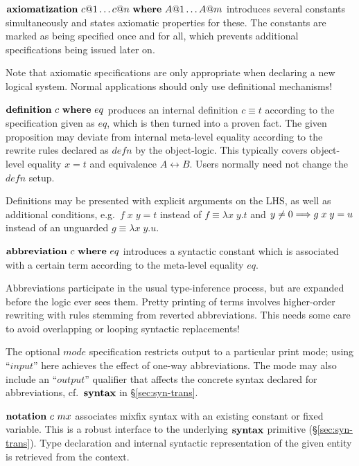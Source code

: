 \begin{descr}
  
\item ${\mathord{\mathbf{axiomatization}}} ~ c@1 \dots c@n ~
  {\mathord{\mathbf{where}}} ~ A@1 \dots A@m$ introduces several constants
  simultaneously and states axiomatic properties for these.  The
  constants are marked as being specified once and for all, which
  prevents additional specifications being issued later on.
  
  Note that axiomatic specifications are only appropriate when
  declaring a new logical system.  Normal applications should only use
  definitional mechanisms!

\item ${\mathord{\mathbf{definition}}}~c~{\mathord{\mathbf{where}}}~eq$ produces an
  internal definition $c \equiv t$ according to the specification
  given as $eq$, which is then turned into a proven fact.  The given
  proposition may deviate from internal meta-level equality according
  to the rewrite rules declared as $defn$ by the object-logic.  This
  typically covers object-level equality $x = t$ and equivalence $A
  \leftrightarrow B$.  Users normally need not change the $defn$
  setup.
  
  Definitions may be presented with explicit arguments on the LHS, as
  well as additional conditions, e.g.\ $f\;x\;y = t$ instead of $f
  \equiv \lambda x\;y. t$ and $y \not= 0 \Longrightarrow g\;x\;y = u$ instead of
  an unguarded $g \equiv \lambda x\;y. u$.
  
\item ${\mathord{\mathbf{abbreviation}}}~c~{\mathord{\mathbf{where}}}~eq$ introduces
  a syntactic constant which is associated with a certain term
  according to the meta-level equality $eq$.
  
  Abbreviations participate in the usual type-inference process, but
  are expanded before the logic ever sees them.  Pretty printing of
  terms involves higher-order rewriting with rules stemming from
  reverted abbreviations.  This needs some care to avoid overlapping
  or looping syntactic replacements!
  
  The optional $mode$ specification restricts output to a particular
  print mode; using ``$input$'' here achieves the effect of one-way
  abbreviations.  The mode may also include an ``$output$'' qualifier
  that affects the concrete syntax declared for abbreviations, cf.\ 
  ${\mathord{\mathbf{syntax}}}$ in \S\ref{sec:syn-trans}.
  
\item ${\mathord{\mathbf{notation}}}~c~mx$ associates mixfix syntax with an
  existing constant or fixed variable.  This is a robust interface to
  the underlying ${\mathord{\mathbf{syntax}}}$ primitive
  (\S\ref{sec:syn-trans}).  Type declaration and internal syntactic
  representation of the given entity is retrieved from the context.
  
\end{descr}

